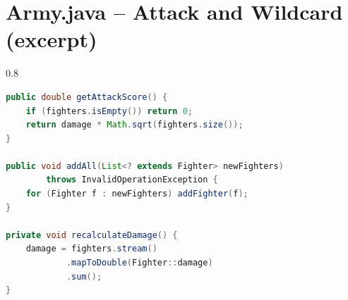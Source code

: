 \documentclass[format=acmsmall, review=false, screen=true]{acmart}
\begin{document}
\clearpage

\section{Army.java -- Attack and Wildcard (excerpt)}
\begin{spacing}{0.8}
\begin{lstlisting}[language=Java]
public double getAttackScore() {
    if (fighters.isEmpty()) return 0;
    return damage * Math.sqrt(fighters.size());
}

public void addAll(List<? extends Fighter> newFighters)
        throws InvalidOperationException {
    for (Fighter f : newFighters) addFighter(f);
}

private void recalculateDamage() {
    damage = fighters.stream()
            .mapToDouble(Fighter::damage)
            .sum();
}
\end{lstlisting}
\end{spacing}
\end{document}
